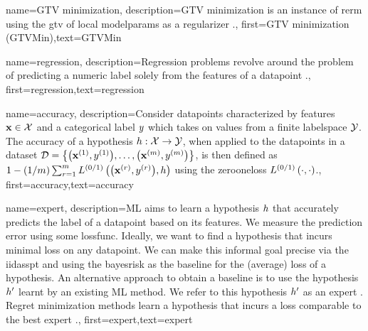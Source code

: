 {name={GTV minimization},
	description={GTV minimization is an instance of \gls{rerm} 
		using the \gls{gtv} of local \gls{modelparams} as a \gls{regularizer} \cite{ClusteredFLTVMinTSP}.},
	first={GTV minimization (GTVMin)},text={GTVMin} 
}

{name={regression},
	description={Regression problems revolve around the problem of 
		predicting a numeric \gls{label} solely from the \gls{feature}s of a \gls{datapoint} \cite[Ch. 2]{MLBasics}.},
	first={regression},text={regression} 
}

{name={accuracy},
	description={Consider \gls{datapoint}s characterized by \gls{feature}s ${\bf x} \in \mathcal{X}$ and 
		a categorical label $y$ which takes on values from a finite \gls{labelspace} $\mathcal{Y}$. The 
		accuracy of a \gls{hypothesis} $h: \mathcal{X} \rightarrow \mathcal{Y}$, when applied 
		to the \gls{datapoint}s in a \gls{dataset} $\mathcal{D} = \big\{ \big({\bf x}^{(1)}, y^{(1)} \big), \ldots, \big({\bf x}^{(m)},y^{(m)}\big) \big\}$, 
		is then defined as $1 - (1/m)\sum_{r=1}^{m} L^{(0/1)}\left(\big({\bf x}^{(r)},y^{(r)}\big),h \right)$ using the \gls{zerooneloss} $L^{(0/1)}\left(\cdot,\cdot \right)$.},
	first={accuracy},text={accuracy} 
}





{name={expert},
	description={ML aims to learn a \gls{hypothesis} $h$ that accurately predicts the \gls{label} 
		of a \gls{datapoint} based on its \gls{feature}s. We measure the prediction error using 
		some \gls{lossfunc}. Ideally, we want to find a \gls{hypothesis} that incurs minimal \gls{loss} 
		on any \gls{datapoint}. We can make this informal goal precise via the \gls{iidasspt} 
		and using the \gls{bayesrisk} as the \gls{baseline} for the (average) \gls{loss} of a \gls{hypothesis}. 
		An alternative approach to obtain a \gls{baseline} is to use the \gls{hypothesis} $h'$ learnt 
		by an existing ML method. We refer to this \gls{hypothesis} $h'$ as an expert \cite{PredictionLearningGames}. Regret minimization methods learn a \gls{hypothesis}
		that incurs a \gls{loss} comparable to the best expert \cite{PredictionLearningGames,HazanOCO}.},
	first={expert},text={expert} 
}

